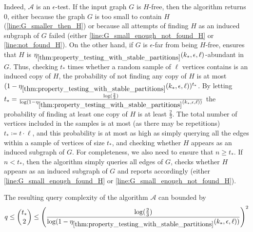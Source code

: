     Indeed, $\mathcal{A}$ is an $\epsilon$-test.
    If the input graph $G$ is $H$-free, then the algorithm returns $0$, either because the graph $G$ is too small to
    contain $H$ (\cref{line:G_smaller_then_H}) or because all attempts of finding $H$ as an induced subgraph of $G$
    failed (either \cref{line:G_small_enough_not_found_H} or \cref{line:not_found_H}).
    On the other hand, if $G$ is $\epsilon$-far from being $H$-free, 
    ensures that $H$ is $\eta_{\ref{thm:property_testing_with_stable_partitions}}(k_*, \epsilon, \ell)$-abundant in $G$.
    Thus, checking $t_*$ times whether a random sample of $\ell$ vertices contains is an
    induced copy of $H$, the probability of not finding any copy of $H$ is at most
    $( 1 - \eta_{\ref{thm:property_testing_with_stable_partitions}}(k_*, \epsilon, \ell) )^{t_*}$.
    By letting $t_* = \frac{\log( \frac{2}{3} )}
        {\log( 1 - \eta_{\ref{thm:property_testing_with_stable_partitions}}(k_*, \epsilon, \ell) )}$
    the probability of finding at least one copy of $H$ is at least $\frac{2}{3}$.
    The total number of vertices included in the samples is at most (as there may be repetitions) $t_* \coloneqq t \cdot \ell$,
    and this probability is at most as high as simply querying all the edges within a sample of vertices of size
    $t_*$, and checking whether $H$ appears as an induced subgraph of $G$.
    For completeness, we also need to ensure that $n \geq t_*$.
    If $n < t_*$, then the algorithm simply queries all edges of $G$, checks whether $H$ appears as an induced subgraph
    of $G$ and reports accordingly (either \cref{line:G_small_enough_found_H} or \cref{line:G_small_enough_not_found_H}).

    The resulting query complexity of the algorithm $\mathcal{A}$ can bounded by
    \[
        q \leq {t_* \choose 2}
          \leq \left(  \frac{\log( \frac{2}{3} )}
               {\log( 1 - \eta_{\ref{thm:property_testing_with_stable_partitions}}(k_*, \epsilon, \ell) )} \right)^2
    \]


